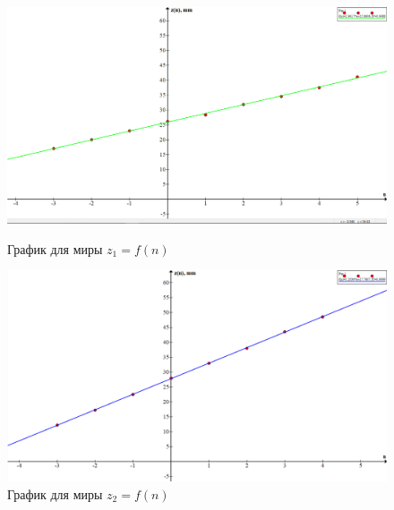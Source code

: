 \documentclass[15pt,a5paper,reqno]{article}
\begin{document}
\begin{figure}[h!]
  \begin{minipage}[b]{0.8\textwidth}
      \includegraphics[width=\textwidth]{pics/lab_436_5.png}
      \caption{График для миры $z_1 = f(n)$}
  \end{minipage}

  \begin{minipage}[b]{0.8\textwidth}
      \includegraphics[width=\textwidth]{pics/lab_436_6.png}
      \caption{График для миры $z_2 = f(n)$}
  \end{minipage}
\end{figure}
\end{document}
